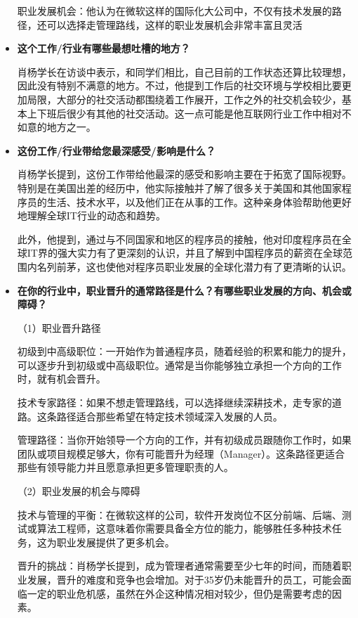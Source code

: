 \begin{itemize}
职业发展机会：他认为在微软这样的国际化大公司中，不仅有技术发展的路径，还可以选择走管理路线，这样的职业发展机会非常丰富且灵活


    \item \textbf{这个工作/行业有哪些最想吐槽的地方？}

肖杨学长在访谈中表示，和同学们相比，自己目前的工作状态还算比较理想，因此没有特别不满意的地方。不过，他提到工作后的社交环境与学校相比要更加局限，大部分的社交活动都围绕着工作展开，工作之外的社交机会较少，基本上下班后很少有其他的社交活动。这一点可能是他互联网行业工作中相对不如意的地方之一。

    \item \textbf{这份工作/行业带给您最深感受/影响是什么？}

肖杨学长提到，这份工作带给他最深的感受和影响主要在于拓宽了国际视野。特别是在美国出差的经历中，他实际接触并了解了很多关于美国和其他国家程序员的生活、技术水平，以及他们正在从事的工作。这种亲身体验帮助他更好地理解全球IT行业的动态和趋势。

此外，他提到，通过与不同国家和地区的程序员的接触，他对印度程序员在全球IT界的强大实力有了更深刻的认识，并且了解到中国程序员的薪资在全球范围内名列前茅，这也使他对程序员职业发展的全球化潜力有了更清晰的认识。

    \item \textbf{在你的行业中，职业晋升的通常路径是什么？有哪些职业发展的方向、机会或障碍？}

（1）职业晋升路径

初级到中高级职位：一开始作为普通程序员，随着经验的积累和能力的提升，可以逐步升到初级或中高级职位。通常是当你能够独立承担一个方向的工作时，就有机会晋升。

技术专家路径：如果不想走管理路线，可以选择继续深耕技术，走专家的道路。这条路径适合那些希望在特定技术领域深入发展的人员。

管理路径：当你开始领导一个方向的工作，并有初级成员跟随你工作时，如果团队或项目规模足够大，你有可能晋升为经理（Manager）。这条路径更适合那些有领导能力并且愿意承担更多管理职责的人。

（2）职业发展的机会与障碍

技术与管理的平衡：在微软这样的公司，软件开发岗位不区分前端、后端、测试或算法工程师，这意味着你需要具备全方位的能力，能够胜任多种技术任务，这为职业发展提供了更多机会。

晋升的挑战：肖杨学长提到，成为管理者通常需要至少七年的时间，而随着职业发展，晋升的难度和竞争也会增加。对于35岁仍未能晋升的员工，可能会面临一定的职业危机感，虽然在外企这种情况相对较少，但仍是需要考虑的因素。


\end{itemize}
